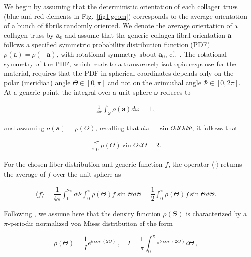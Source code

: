 \documentclass[preprint,12pt]{elsarticle}
\newcommand{\mbs}[1]{\boldsymbol{#1}}
\def\ba{{\mbs{a}}} \def\bb{{\mbs{b}}} \def\bc{{\mbs{c}}}
\begin{document}
We begin by assuming that the deterministic orientation of each collagen truss (blue and red elements in Fig.~\ref{fig1:geom}) corresponds to the average orientation of a bunch of fibrils randomly oriented. We denote the average orientation of a collagen truss by $\ba_0$ and assume that the generic collagen fibril orientation $\ba$ follows a specified symmetric probability distribution function (PDF) $\rho(\ba)=\rho(-\ba)$, with rotational symmetry about $\ba_0$, cf.~\cite{pandolfi2012fiber, vasta2014three}. The rotational symmetry of the PDF, which leads to a transversely isotropic response for the material, requires that the PDF in spherical coordinates depends only on the polar (meridian) angle $\Theta \in \left[0,\pi \right]$ and not on the azimuthal angle $\Phi \in \left[0,2\pi \right]$. At a generic point, the integral over a unit sphere $\omega$ reduces to
\begin{linenomath}
\begin{align}\label{eq:1}
   \frac{1}{4 \pi} \int_{\omega} \rho(\ba) d \omega = 1 \, ,
\end{align}
\end{linenomath}
and assuming $\rho(\ba)=\rho(\Theta)$, recalling that $d \omega= \sin{\Theta} d \Theta d \Phi$, it follows that
\begin{linenomath}
\begin{align}
    \int_0^{\pi}  \rho(\Theta) \sin{\Theta}  d \Theta = 2.
\end{align}
\end{linenomath}
For the chosen fiber distribution and generic function $f$, the operator $\langle \cdot \rangle$ returns the average of $f$ over the unit sphere as
\begin{linenomath}
\begin{align}
 \langle f \rangle
	= \dfrac{1}{4\pi}
	\int_0^{2\pi} d\Phi
	\int_0^\pi \rho( \Theta) f \sin \Theta d \Theta=\dfrac{1}{2} \int_0^\pi \rho( \Theta) f \sin \Theta d \Theta.
    \label{eq:average}
\end{align}
\end{linenomath}
Following \cite{pandolfi2012fiber, vasta2014three}, we assume here that the density function $\rho (\Theta)$ is characterized by a $\pi$-periodic normalized von Mises distribution of the form
\begin{linenomath}
\begin{equation}
	\rho( \Theta) = \dfrac{1}{ I} e^{b\cos(2 \Theta)} \,,\quad
	I = \dfrac{1}{\pi} \int_0^\pi e^{b\cos(2 \Theta)} d \Theta \,,\label{eq:5}
\end{equation}
\end{linenomath}
\end{document}
